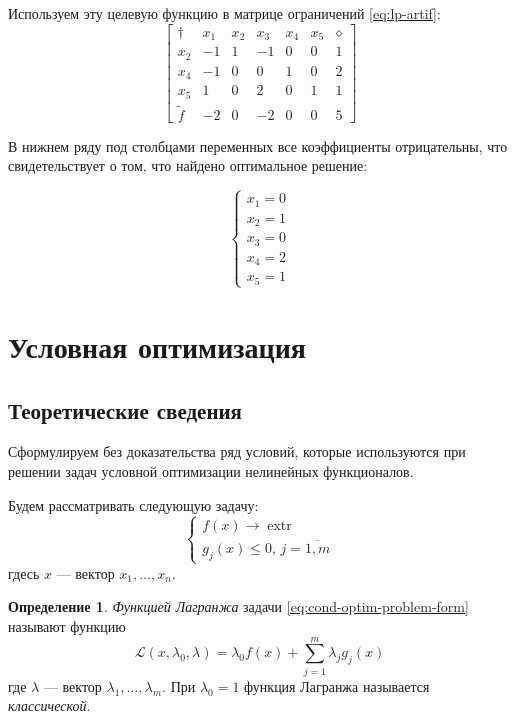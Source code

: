 \documentclass{article}
\renewcommand{\leq}{\leqslant}
\providecommand{\La}{\mathcal{L}}
\DeclareMathOperator{\extr}{extr}
\theoremstyle{remark}
\theoremstyle{definition}
\newtheorem{dfn}{Определение}[section]
\numberwithin{equation}{section}
\begin{document}
Используем эту целевую функцию в матрице ограничений \eqref{eq:lp-artif}:
\begin{equation*}
  \begin{bmatrix}
    \dagger & x_1 & x_2 & x_3 & x_4 & x_5 & \diamond\\
    x_2 & -1 & 1 & -1 & 0 & 0 & 1\\
    x_4 & -1 & 0 &  0 & 1 & 0 & 2\\
    x_5 &  1 & 0 &  2 & 0 & 1 & 1\\
    \tilde{f} & -2 & 0 & -2 & 0 & 0 & 5
  \end{bmatrix}
\end{equation*}

В нижнем ряду под столбцами переменных все коэффициенты отрицательны,
что свидетельствует о том, что найдено оптимальное решение:

\begin{equation}
  \begin{cases}
    x_1 = 0\\
    x_2 = 1\\
    x_3 = 0\\
    x_4 = 2\\
    x_5 = 1
  \end{cases}
\end{equation}

\clearpage
\section{Условная оптимизация}
\label{sec:kuhn-tucker}

\subsection{Теоретические сведения}

Сформулируем без доказательства ряд условий, которые используются при
решении задач условной оптимизации нелинейных функционалов. 

Будем рассматривать следующую задачу:
\begin{equation}
  \label{eq:cond-optim-problem-form}
  \begin{cases}
    f(x) \to \extr \\
    g_j(x) \leq 0,\, j=\overline{1,m}
  \end{cases}
\end{equation}
гдесь $x$ — вектор $x_1, \dotsc, x_n$.

\begin{dfn} \emph{Функцией Лагранжа} задачи
  \eqref{eq:cond-optim-problem-form} называют функцию
  \begin{equation}
    \label{eq:lagrange-form}
    \La(x, \lambda_0, \lambda) = \lambda_0 f(x) + \sum_{j=1}^m {\lambda_j g_j(x)}
  \end{equation}
  где $\lambda$ — вектор $\lambda_1, \dotsc, \lambda_m$. При
  $\lambda_0=1$ функция Лагранжа называется \emph{классической}.
\end{dfn}
\end{document}
